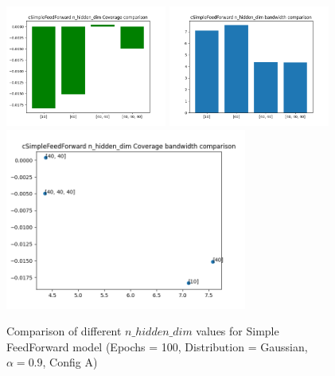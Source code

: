 \documentclass[a4paper, 12pt]{article}
\begin{document}
\begin{figure}[!h]
    \centering
    \includegraphics[width=200px]{plots/hist/a/cSimpleFeedForward/n_hidden_dim/Coverage.png}
    \includegraphics[width=200px]{plots/hist/a/cSimpleFeedForward/n_hidden_dim/bandwidth.png}
    \includegraphics[width=300px]{plots/scatter/a/cSimpleFeedForward/n_hidden_dim/Coverage_bandwidth.png}
    \caption{Comparison of different $n\_hidden\_dim$ values for Simple FeedForward model (Epochs = 100, Distribution = Gaussian, $\alpha = 0.9$, Config A)}
    \label{fig:comp_feedfordward}
\end{figure}
\end{document}
